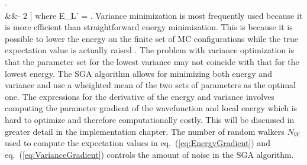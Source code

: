 -    \nonumber \\
\label{eq:VarianceGradient}
&&\quad - 2 \biggr]
\eea
where
\be
E_L' = .
\ee
Variance minimization is most frequently used because it is more efficient than straightforward energy minimization. This is because it is possible to lower the energy on the finite set of MC configurations while the true expectation value is actually raised \cite{article:Umrigar2005}. The problem with variance optimization is that the parameter set for the  lowest variance may not coincide with that for the lowest energy. The SGA algorithm allows for minimizing both energy and variance and use a wheighted mean of the two sets of parameters as the optimal one. The expressions for the derivative of the energy and variance involves computing the parameter gradient of the wavefunction and local energy which is hard to optimize and therefore computationally costly. This will be discussed in greater detail in the implementation chapter. The number of random walkers $N_W$ used to compute the expectation values in eq.~(\ref{eq:EnergyGradient}) and eq.~(\ref{eq:VarianceGradient}) controls the amount of noise in the SGA algorithm. 
